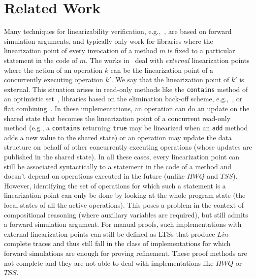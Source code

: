 \vspace{-1mm}
\section{Related Work}
Many techniques for linearizability verification, e.g.,~\cite{conf/ppopp/VafeiadisHHS06,conf/cav/AmitRRSY07,conf/vmcai/Vafeiadis09,conf/tacas/AbdullaHHJR13}, are based on forward simulation arguments, and typically only work for libraries where the linearization point of every invocation of a method $m$ is fixed to a particular statement in the code of $m$. The works in~\cite{conf/cav/Vafeiadis10,Derrick2011,conf/cav/DragoiGH13,DBLP:conf/cav/ZhuPJ15} deal with \emph{external} linearization points where the action of an operation $k$ can be the linearization point of a concurrently executing operation $k'$. We say that the linearization point of $k'$ is external. This situation arises in read-only methods like the {\tt contains} method of an optimistic set~\cite{conf/podc/OHearnRVYY10}, libraries based on the elimination back-off scheme, e.g.,~\cite{conf/spaa/HendlerSY04}, or flat combining~\cite{DBLP:conf/spaa/HendlerIST10,DBLP:conf/podc/GorelikH13}. 
In these implementations, an operation can do an update on the shared state that becomes the linearization point of a concurrent read-only method (e.g., a {\tt contains} returning {\tt true} may be linearized when an {\tt add} method adds a new value to the shared state) or an operation may update the data structure on behalf of other concurrently executing operations (whose updates are published in the shared state). In all these cases, every linearization point can still be associated syntactically to a statement in the code of a method and doesn't depend on operations executed in the future (unlike $\mathit{HWQ}$ and $\mathit{TSS}$). However, identifying the set of operations for which such a statement is a linearization point can only be done by looking at the whole program state (the local states of all the active operations). This poses a problem in the context of compositional reasoning (where auxiliary variables are required), but still admits a forward simulation argument. For manual proofs, such implementations with external linearization points can still be defined as LTSs that produce $Lin$-complete traces and thus still fall in the class of implementations for which forward simulations are enough for proving refinement. These proof methods are not complete and they are not able to deal with implementations like $\mathit{HWQ}$ or $\mathit{TSS}$.

